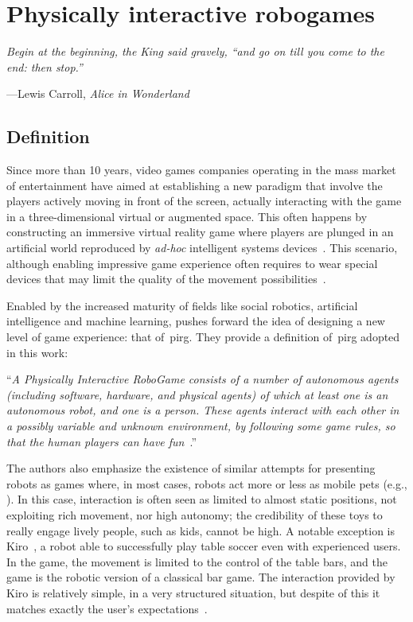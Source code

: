 \chapter{Physically interactive robogames}\label{ch:art}
\epigraph{\itshape Begin at the beginning, the King said gravely, ``and go on till you come to the end: then stop.''}{---Lewis Carroll, \textit{Alice in Wonderland}}

\section{Definition}
Since more than 10 years, video games companies operating in the mass market of entertainment have aimed at establishing a new paradigm that involve the players actively moving in front of the screen, actually interacting with the game in a three-dimensional virtual or augmented space. This often happens by constructing an immersive virtual reality game where players are plunged in an artificial world reproduced by \textit{ad-hoc} intelligent systems devices~\citep{zyda_visual_2005}. This scenario, although enabling impressive game experience often requires to wear special devices that may limit the quality of the movement possibilities~\citep{martinoia_physically_2013}.

Enabled by the increased maturity of fields like social robotics, artificial intelligence and machine learning, \cite{martinoia_physically_2013} pushes forward the idea of designing a new level of game experience: that of~\glsdesc{pirg}. They provide a definition of~\gls{pirg} adopted in this work:

``\textit{A Physically Interactive RoboGame consists of a number of autonomous agents (including software, hardware, and physical agents) of which at least one is an autonomous robot, and one is a person. These agents interact with each other in a possibly variable and unknown environment, by following some game rules, so that the human players can have fun}~\citep{martinoia_physically_2013}.''

The authors also emphasize the existence of similar attempts for presenting robots as games where, in most cases, robots act more or less as mobile pets (e.g., \cite{fujita_open_1997,shibata_emotional_1996}). In this case, interaction is often seen as limited to almost static positions, not exploiting rich movement, nor high autonomy; the credibility of these toys to really engage lively people, such as kids, cannot be high. A notable exception is Kiro~\citep{weigel_kiro-table_2005}, a robot able to successfully play table soccer even with experienced users. In the game, the movement is limited to the control of the table bars, and the game is the robotic version of a classical bar game. The interaction provided by Kiro is relatively simple, in a very structured situation, but despite of this it matches exactly the user's expectations~\citep{martinoia_physically_2013}.

